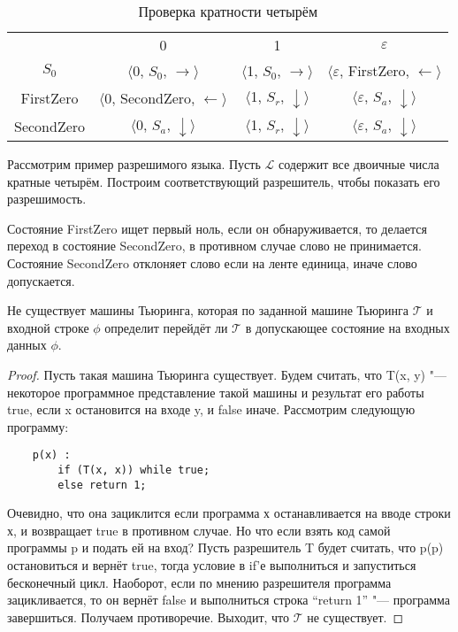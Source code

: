 \begin{table}[h]
    \centering
    \begin{tabular}{c c c c}
        & 0 & 1 & $\varepsilon$ \\
        
        $S_0$ &
        $\langle$0, $S_0$, $\rightarrow\rangle$ & 
        $\langle$1, $S_0$, $\rightarrow\rangle$ & 
        $\langle\varepsilon$, FirstZero, $\leftarrow\rangle$ \\
        
        FirstZero &
        $\langle$0, SecondZero, $\leftarrow\rangle$ &
        $\langle$1, $S_r$, $\downarrow\rangle$ &
        $\langle\varepsilon$, $S_a$, $\downarrow\rangle$ \\
        
        SecondZero &
        $\langle$0, $S_a$, $\downarrow\rangle$ &
        $\langle$1, $S_r$, $\downarrow\rangle$ &
        $\langle\varepsilon$, $S_a$, $\downarrow\rangle$ \\
    \end{tabular}
    \caption{Проверка кратности четырём}
\end{table}

Рассмотрим пример разрешимого языка. Пусть $\mathcal{L}$ содержит все двоичные числа кратные четырём.
Построим соответствующий разрешитель, чтобы показать его разрешимость.

Состояние FirstZero ищет первый ноль, если он обнаруживается, то делается переход в состояние SecondZero,
в противном случае слово не принимается. Состояние SecondZero отклоняет слово если на ленте единица,
иначе слово допускается. 

\begin{theorem} Не существует машины Тьюринга, которая по заданной машине Тьюринга $\mathcal{T}$ и
входной строке $\phi$ определит перейдёт ли $\mathcal{T}$ в допускающее состояние на входных данных
$\phi$.
\end{theorem}

\begin{proof} 
Пусть такая машина Тьюринга существует. Будем считать, что T(x, y) "--- некоторое программное
представление такой машины и результат его работы true, если x остановится на входе y, и false иначе.
Рассмотрим следующую программу:

\begin{verbatim}
    p(x) : 
        if (T(x, x)) while true;
        else return 1;
\end{verbatim}

Очевидно, что она зациклится если программа х останавливается на вводе строки х, и возвращает true в
противном случае. Но что если взять код самой программы p и подать ей на вход? Пусть разрешитель T будет
считать, что p(p) остановиться и вернёт true, тогда условие в if'е выполниться и запуститься бесконечный
цикл. Наоборот, если по мнению разрешителя программа зацикливается, то он вернёт false и выполниться
строка ``return 1'' "--- программа завершиться. Получаем противоречие. Выходит, что $\mathcal{T}$ не
существует.
\end{proof}

